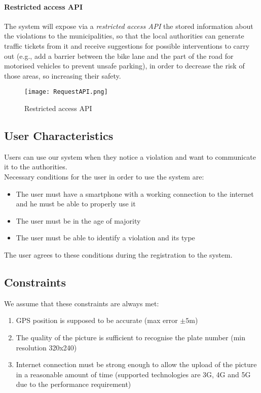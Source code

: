 \paragraph{Restricted access API}
The system will expose via a \emph{restricted access API} the stored information about the violations to the municipalities, so that the local authorities can generate traffic tickets from it and receive suggestions for possible interventions to carry out (e.g., add a barrier between the bike lane and the part of the road for motorised vehicles to prevent unsafe parking), in order to decrease the risk of those areas, so increasing their safety. 
	\newline
	\begin{figure}[h]
		\centering
		\texttt{[image: RequestAPI.png]}
		\caption{
			\label{fig:restrictedAPI} Restricted access API
		}
	\end{figure}


\subsection{User Characteristics}
	Users can use our system when they notice a violation and want to communicate it to the authorities.\\
 	Necessary conditions for the user in order to use the system are:
 	\begin{itemize}
 		\item The user must have a smartphone with a working connection to the internet and he must be able to properly use it
 		\item The user must be in the age of majority
 		\item The user must be able to identify a violation and its type
 	\end{itemize}
 	The user agrees to these conditions during the registration to the system.
 	
\subsection{Constraints}
\label{sec:constraints}
	We assume that these constraints are always met:
	\begin{enumerate}[label=\textbf{C\arabic*}]
		\item GPS position is supposed to be accurate (max error $\pm5$m)
		\item The quality of the picture is sufficient to recognise the plate number (min resolution 320x240)
		\item Internet connection must be strong enough to allow the upload of the picture in a reasonable amount of time (supported technologies are 3G, 4G and 5G due to the performance requirement)
	\end{enumerate}
	
